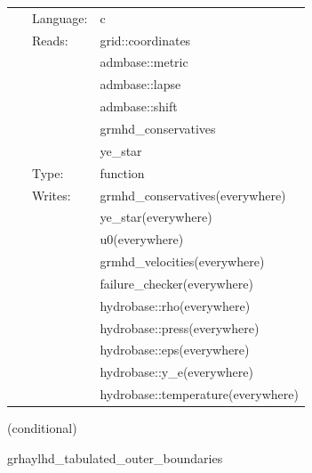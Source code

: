 \hspace{5mm}{\it tabulated version of grhaylhd\_conservs\_to\_prims } 


\hspace{5mm}

 \begin{tabular*}{160mm}{cll} 
~ & Language:  & c \\ 
~ & Reads:  & grid::coordinates \\ 
~& ~ &admbase::metric\\ 
~& ~ &admbase::lapse\\ 
~& ~ &admbase::shift\\ 
~& ~ &grmhd\_conservatives\\ 
~& ~ &ye\_star\\ 
~ & Type:  & function \\ 
~ & Writes:  & grmhd\_conservatives(everywhere) \\ 
~& ~ &ye\_star(everywhere)\\ 
~& ~ &u0(everywhere)\\ 
~& ~ &grmhd\_velocities(everywhere)\\ 
~& ~ &failure\_checker(everywhere)\\ 
~& ~ &hydrobase::rho(everywhere)\\ 
~& ~ &hydrobase::press(everywhere)\\ 
~& ~ &hydrobase::eps(everywhere)\\ 
~& ~ &hydrobase::y\_e(everywhere)\\ 
~& ~ &hydrobase::temperature(everywhere)\\ 
\end{tabular*} 


\vspace{5mm}

   (conditional) 

\hspace{5mm} grhaylhd\_tabulated\_outer\_boundaries 

\hspace{5mm}{\it tabulated version of grhaylhd\_outer\_boundaries } 


\hspace{5mm}

